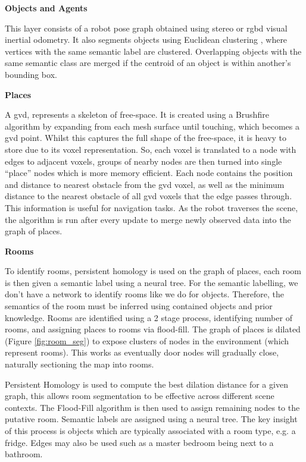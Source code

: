 \noindent \textbf{Objects and Agents}

This layer consists of a robot pose graph obtained using stereo or \acrshort{rgbd} visual inertial odometry. It also segments objects using Euclidean clustering , where vertices with the same semantic label are clustered. Overlapping objects with the same semantic class are merged if the centroid of an object is within another's bounding box.

\noindent \textbf{Places}

A \gls{gvd}, represents a skeleton of free-space. It is created using a Brushfire algorithm by expanding from each mesh surface until touching, which becomes a \gls{gvd} point. Whilst this captures the full shape of the free-space, it is heavy to store due to its voxel representation. So, each voxel is translated to a node with edges to adjacent voxels, groups of nearby nodes are then turned into single “place” nodes which is more memory efficient. Each node contains the position and distance to nearest obstacle from the \gls{gvd} voxel, as well as the minimum distance to the nearest obstacle of all \gls{gvd} voxels that the edge passes through. This information is useful for navigation tasks. As the robot traverses the scene, the algorithm is run after every update to merge newly observed data into the graph of places.

\noindent \textbf{Rooms}

To identify rooms, persistent homology is used on the graph of places, each room is then given a semantic label using a neural tree. For the semantic labelling, we don’t have a network to identify rooms like we do for objects. Therefore, the semantics of the room must be inferred using contained objects and prior knowledge. Rooms are identified using a 2 stage process, identifying number of rooms, and assigning places to rooms via flood-fill.
The graph of places is dilated (Figure \ref{fig:room_seg}) to expose clusters of nodes in the environment (which represent rooms). This works as eventually door nodes will gradually close, naturally sectioning the map into rooms.

Persistent Homology is used to compute the best dilation distance for a given graph, this allows room segmentation to be effective across different scene contexts. The Flood-Fill algorithm is then used to assign remaining nodes to the putative room.
Semantic labels are assigned using a neural tree. The key insight of this process is objects which are typically associated with a room type, e.g. a fridge. Edges may also be used such as a master bedroom being next to a bathroom.

